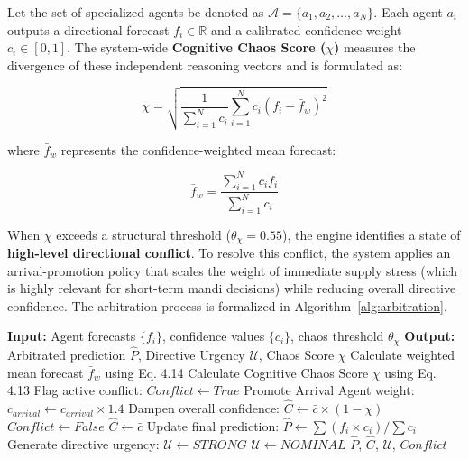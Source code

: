 \documentclass[12pt,a4paper]{report}
\begin{document}
Let the set of specialized agents be denoted as $\mathcal{A} = \{a_1, a_2, \dots, a_N\}$. Each agent $a_i$ outputs a directional forecast $f_i \in \mathbb{R}$ and a calibrated confidence weight $c_i \in [0,1]$. The system-wide \textbf{Cognitive Chaos Score ($\chi$)} measures the divergence of these independent reasoning vectors and is formulated as:

\begin{equation}
\chi = \sqrt{\frac{1}{\sum_{i=1}^{N} c_i} \sum_{i=1}^{N} c_i \left( f_i - \bar{f}_{w} \right)^2}
\end{equation}

where $\bar{f}_{w}$ represents the confidence-weighted mean forecast:

\begin{equation}
\bar{f}_{w} = \frac{\sum_{i=1}^{N} c_i f_i}{\sum_{i=1}^{N} c_i}
\end{equation}

When $\chi$ exceeds a structural threshold ($\theta_{\chi} = 0.55$), the engine identifies a state of \textbf{high-level directional conflict}. To resolve this conflict, the system applies an arrival-promotion policy that scales the weight of immediate supply stress (which is highly relevant for short-term mandi decisions) while reducing overall directive confidence. The arbitration process is formalized in Algorithm~\ref{alg:arbitration}.

\begin{algorithm}[H]
\caption{Cognitive Deliberation and arbitration}
\label{alg:arbitration}
\begin{algorithmic}[1]
\State \textbf{Input:} Agent forecasts $\{f_i\}$, confidence values $\{c_i\}$, chaos threshold $\theta_{\chi}$
\State \textbf{Output:} Arbitrated prediction $\hat{P}$, Directive Urgency $\mathcal{U}$, Chaos Score $\chi$
\State Calculate weighted mean forecast $\bar{f}_{w}$ using Eq. 4.14
\State Calculate Cognitive Chaos Score $\chi$ using Eq. 4.13
\If{$\chi > \theta_{\chi}$}
    \State Flag active conflict: $Conflict \leftarrow True$
    \State Promote Arrival Agent weight: $c_{arrival} \leftarrow c_{arrival} \times 1.4$
    \State Dampen overall confidence: $\hat{C} \leftarrow \bar{c} \times (1 - \chi)$
\Else
    \State $Conflict \leftarrow False$
    \State $\hat{C} \leftarrow \bar{c}$
\EndIf
\State Update final prediction: $\hat{P} \leftarrow \sum (f_i \times c_i) / \sum c_i$
\State Generate directive urgency:
    \State $\mathcal{U} \leftarrow STRONG$
\Else
    \State $\mathcal{U} \leftarrow NOMINAL$
\EndIf
\State \Return $\hat{P}$, $\hat{C}$, $\mathcal{U}$, $Conflict$
\end{algorithmic}
\end{algorithm}
\end{document}
